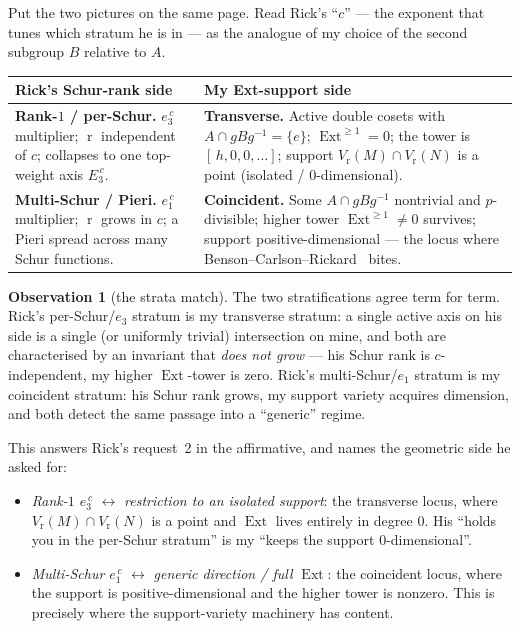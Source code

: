 \documentclass[11pt]{amsart}
\theoremstyle{plain}
\theoremstyle{definition}
\newtheorem{observation}[theorem]{Observation}
\DeclareMathOperator{\Ext}{Ext}
\DeclareMathOperator{\rk}{r}
\newcommand{\Vr}{V_{\mathrm{r}}}
\begin{document}
Put the two pictures on the same page. Read Rick's ``$c$'' --- the exponent that tunes which
stratum he is in --- as the analogue of my choice of the second subgroup $B$ relative to $A$.

\begin{center}
\renewcommand{\arraystretch}{1.35}
\begin{tabular}{@{}p{}p{}@{}}
\toprule
\textbf{Rick's Schur-rank side} & \textbf{My Ext-support side}\\
\midrule
\textbf{Rank-$1$ / per-Schur.} $e_3^{\,c}$ multiplier; $\rk$ independent of $c$; collapses to
one top-weight axis $E_3^{\,c}$.
&
\textbf{Transverse.} Active double cosets with $A\cap gBg^{-1}=\{e\}$; $\Ext^{\ge1}=0$; the
tower is $[\,h,0,0,\dots]$; support $\Vr(M)\cap\Vr(N)$ is a point (isolated / $0$-dimensional).\\
\addlinespace
\textbf{Multi-Schur / Pieri.} $e_1^{\,c}$ multiplier; $\rk$ grows in $c$; a Pieri spread
across many Schur functions.
&
\textbf{Coincident.} Some $A\cap gBg^{-1}$ nontrivial and $p$-divisible; higher tower
$\Ext^{\ge1}\ne0$ survives; support positive-dimensional --- the locus where
Benson--Carlson--Rickard~\cite{benson-carlson-rickard} bites.\\
\bottomrule
\end{tabular}
\end{center}

\begin{observation}[the strata match]
The two stratifications agree term for term. Rick's per-Schur/$e_3$ stratum is my transverse
stratum: a single active axis on his side is a single (or uniformly trivial) intersection on
mine, and both are characterised by an invariant that \emph{does not grow} --- his Schur rank
is $c$-independent, my higher $\Ext$-tower is zero. Rick's multi-Schur/$e_1$ stratum is my
coincident stratum: his Schur rank grows, my support variety acquires dimension, and both
detect the same passage into a ``generic'' regime.
\end{observation}

This answers Rick's request~2 in the affirmative, and names the geometric side he asked for:
\begin{itemize}
  \item \emph{Rank-$1$ $e_3^{\,c}$} $\longleftrightarrow$ \emph{restriction to an isolated
    support}: the transverse locus, where $\Vr(M)\cap\Vr(N)$ is a point and $\Ext$ lives
    entirely in degree $0$. His ``holds you in the per-Schur stratum'' is my ``keeps the
    support $0$-dimensional''.
  \item \emph{Multi-Schur $e_1^{\,c}$} $\longleftrightarrow$ \emph{generic direction / full
    $\Ext$}: the coincident locus, where the support is positive-dimensional and the higher
    tower is nonzero. This is precisely where the support-variety machinery has content.
\end{itemize}
\end{document}
